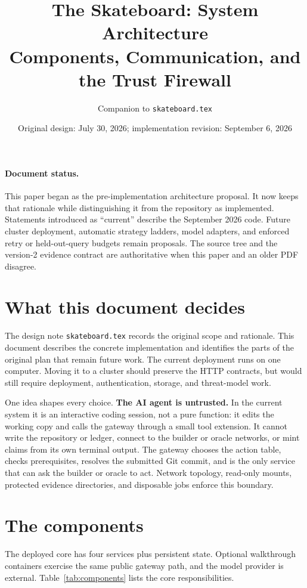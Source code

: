 \documentclass[11pt]{article}
\title{\vspace{-1.2em}The Skateboard: System Architecture\\
\large Components, Communication, and the Trust Firewall\vspace{-0.4em}}
\author{Companion to \texttt{skateboard.tex}}
\date{Original design: July 30, 2026; implementation revision: September 6, 2026}
\newcommand{\code}[1]{\texttt{#1}}
\begin{document}
\maketitle
\vspace{-1.2em}

\paragraph{Document status.}
This paper began as the pre-implementation architecture proposal. It now keeps
that rationale while distinguishing it from the repository as implemented.
Statements introduced as ``current'' describe the September 2026 code. Future
cluster deployment, automatic strategy ladders, model adapters, and enforced
retry or held-out-query budgets remain proposals. The source tree and the
version-2 evidence contract are authoritative when this paper and an older PDF
disagree.

\section{What this document decides}

The design note \code{skateboard.tex} records the original scope and rationale.
This document describes the concrete implementation and identifies the parts
of the original plan that remain future work. The current deployment runs on
one computer. Moving it to a cluster should preserve the HTTP contracts, but
would still require deployment, authentication, storage, and threat-model work.

One idea shapes every choice. \textbf{The AI agent is untrusted.} In the current
system it is an interactive coding session, not a pure function: it edits the
working copy and calls the gateway through a small tool extension. It cannot
write the repository or ledger, connect to the builder or oracle networks, or
mint claims from its own terminal output. The gateway chooses the action table,
checks prerequisites, resolves the submitted Git commit, and is the only
service that can ask the builder or oracle to act. Network topology, read-only
mounts, protected evidence directories, and disposable jobs enforce this
boundary.

\section{The components}

The deployed core has four services plus persistent state. Optional walkthrough
containers exercise the same public gateway path, and the model provider is
external. Table~\ref{tab:components} lists the core responsibilities.
\end{document}
